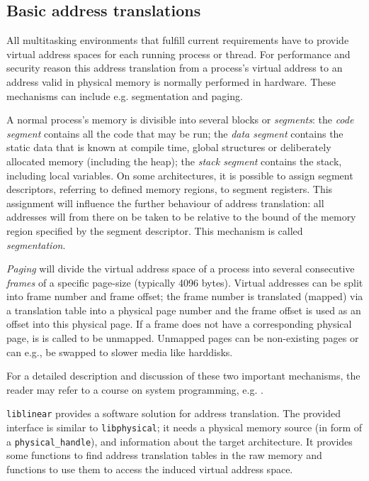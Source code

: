 \subsection{Basic address translations}

\label{address_translation} All multitasking environments that fulfill current
requirements have to provide virtual address spaces for each running process or
thread. For performance and security reason this address translation from a
process's virtual address to an address valid in physical memory is normally
performed in hardware.  These mechanisms can include e.g. segmentation and
paging.

A normal process's memory is divisible into several blocks or \emph{segments}:
the \emph{code segment} contains all the code that may be run; the \emph{data
segment} contains the static data that is known at compile time, global
structures or deliberately allocated memory (including the heap); the
\emph{stack segment} contains the stack, including local variables.  On some
architectures, it is possible to assign segment descriptors, referring to
defined memory regions, to segment registers.  This assignment will influence
the further behaviour of address translation: all addresses will from there on
be taken to be relative to the bound of the memory region specified by the
segment descriptor. This mechanism is called \emph{segmentation}.

\emph{Paging} will divide the virtual address space of a process into several
consecutive \emph{frames} of a specific page-size (typically 4096 bytes).
Virtual addresses can be split into frame number and frame offset; the frame
number is translated (mapped) via a translation table into a physical page
number and the frame offset is used as an offset into this physical page. If a
frame does not have a corresponding physical page, is is called to be unmapped.
Unmapped pages can be non-existing pages or can e.g., be swapped to slower media
like harddisks.

For a detailed description and discussion of these two important mechanisms, the
reader may refer to a course on system programming, e.g.
\cite{rwth_syspro_scriptum:2002}.

\texttt{liblinear} provides a software solution for address translation. The
provided interface is similar to \texttt{libphysical}; it needs a physical
memory source (in form of a \texttt{physical\_handle}), and information about
the target architecture. It provides some functions to find address translation
tables in the raw memory and functions to use them to access the induced virtual
address space.



